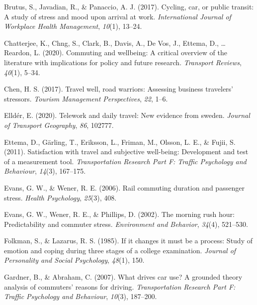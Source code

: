 \documentclass[
11pt, %
oneside, %
english, %
singlespacing, %
]{macthesis} %
\newlength{\cslhangindent}
\newenvironment{CSLReferences}[2] %
 {%
  \setlength{\parindent}{0pt}
  \ifodd #1 \everypar{\setlength{\hangindent}{\cslhangindent}}\ignorespaces\fi
  \ifnum #2 > 0
  \setlength{\parskip}{#2\baselineskip}
  \fi
 }%
 {}
\begin{document}
\begin{CSLReferences}{1}{0}
\leavevmode{}%
Brutus, S., Javadian, R., \& Panaccio, A. J. (2017). Cycling, car, or public transit: A study of stress and mood upon arrival at work. \emph{International Journal of Workplace Health Management}, \emph{10}(1), 13--24.

\leavevmode{}%
Chatterjee, K., Chng, S., Clark, B., Davis, A., De Vos, J., Ettema, D., \ldots{} Reardon, L. (2020). Commuting and wellbeing: A critical overview of the literature with implications for policy and future research. \emph{Transport Reviews}, \emph{40}(1), 5--34.

\leavevmode{}%
Chen, H. S. (2017). Travel well, road warriors: Assessing business travelers' stressors. \emph{Tourism Management Perspectives}, \emph{22}, 1--6.

\leavevmode{}%
Elldér, E. (2020). Telework and daily travel: New evidence from sweden. \emph{Journal of Transport Geography}, \emph{86}, 102777.

\leavevmode{}%
Ettema, D., Gärling, T., Eriksson, L., Friman, M., Olsson, L. E., \& Fujii, S. (2011). Satisfaction with travel and subjective well-being: Development and test of a measurement tool. \emph{Transportation Research Part F: Traffic Psychology and Behaviour}, \emph{14}(3), 167--175.

\leavevmode{}%
Evans, G. W., \& Wener, R. E. (2006). Rail commuting duration and passenger stress. \emph{Health Psychology}, \emph{25}(3), 408.

\leavevmode{}%
Evans, G. W., Wener, R. E., \& Phillips, D. (2002). The morning rush hour: Predictability and commuter stress. \emph{Environment and Behavior}, \emph{34}(4), 521--530.

\leavevmode{}%
Folkman, S., \& Lazarus, R. S. (1985). If it changes it must be a process: Study of emotion and coping during three stages of a college examination. \emph{Journal of Personality and Social Psychology}, \emph{48}(1), 150.

\leavevmode{}%
Gardner, B., \& Abraham, C. (2007). What drives car use? A grounded theory analysis of commuters' reasons for driving. \emph{Transportation Research Part F: Traffic Psychology and Behaviour}, \emph{10}(3), 187--200.


\end{CSLReferences}
\end{document}
